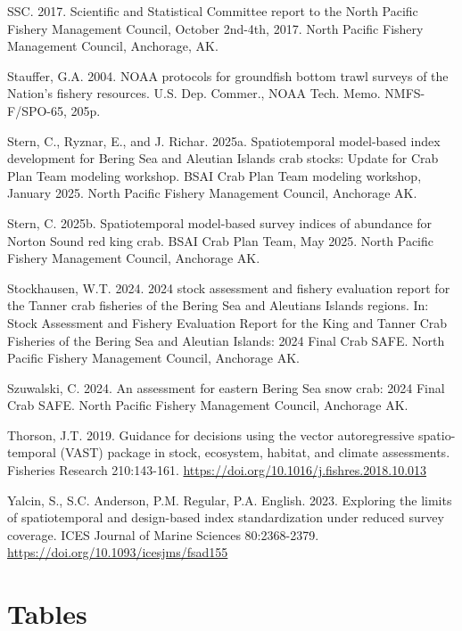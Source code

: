 \documentclass[
]{article}
\begin{document}
SSC. 2017. Scientific and Statistical Committee report to the North Pacific Fishery Management Council, October 2nd-4th, 2017. North Pacific Fishery Management Council, Anchorage, AK.

Stauffer, G.A. 2004. NOAA protocols for groundfish bottom trawl surveys of the Nation's fishery resources. U.S. Dep. Commer., NOAA Tech. Memo. NMFS-F/SPO-65, 205p.

Stern, C., Ryznar, E., and J. Richar. 2025a. Spatiotemporal model-based index development for Bering Sea and Aleutian Islands crab stocks: Update for Crab Plan Team modeling workshop. BSAI Crab Plan Team modeling workshop, January 2025. North Pacific Fishery Management Council, Anchorage AK.

Stern, C. 2025b. Spatiotemporal model-based survey indices of abundance for Norton Sound red king crab. BSAI Crab Plan Team, May 2025. North Pacific Fishery Management Council, Anchorage AK.

Stockhausen, W.T. 2024. 2024 stock assessment and fishery evaluation report for the Tanner crab fisheries of the Bering Sea and Aleutians Islands regions. In: Stock Assessment and Fishery Evaluation Report for the King and Tanner Crab Fisheries of the Bering Sea and Aleutian Islands: 2024 Final Crab SAFE. North Pacific Fishery Management Council, Anchorage AK.

Szuwalski, C. 2024. An assessment for eastern Bering Sea snow crab: 2024 Final Crab SAFE. North Pacific Fishery Management Council, Anchorage AK.

Thorson, J.T. 2019. Guidance for decisions using the vector autoregressive spatio-temporal (VAST) package in stock, ecosystem, habitat, and climate assessments. Fisheries Research 210:143-161. \url{https://doi.org/10.1016/j.fishres.2018.10.013}

Yalcin, S., S.C. Anderson, P.M. Regular, P.A. English. 2023. Exploring the limits of spatiotemporal and design-based index standardization under reduced survey coverage. ICES Journal of Marine Sciences 80:2368-2379. \url{https://doi.org/10.1093/icesjms/fsad155}

\clearpage

\section*{Tables}\label{tables}
\end{document}
